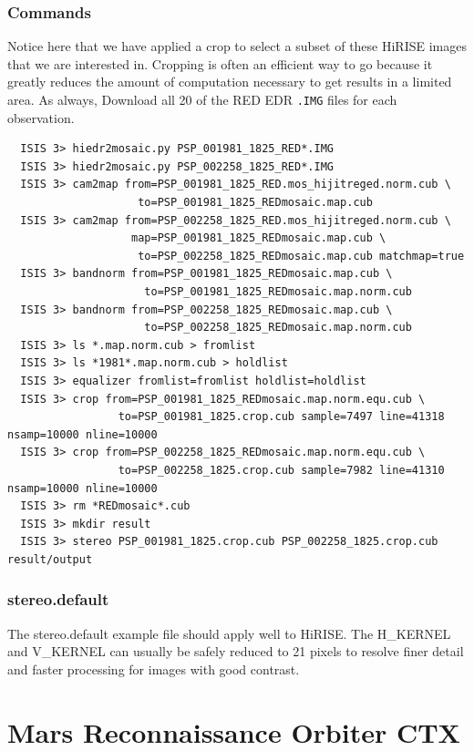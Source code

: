 \subsubsection*{Commands}

Notice here that we have applied a crop to select a subset of these
HiRISE images that we are interested in.  Cropping is often an
efficient way to go because it greatly reduces the amount of
computation necessary to get results in a limited area.  As always,
Download all 20 of the RED EDR \texttt{.IMG} files for each observation.
\begin{verbatim}
  ISIS 3> hiedr2mosaic.py PSP_001981_1825_RED*.IMG
  ISIS 3> hiedr2mosaic.py PSP_002258_1825_RED*.IMG
  ISIS 3> cam2map from=PSP_001981_1825_RED.mos_hijitreged.norm.cub \
                    to=PSP_001981_1825_REDmosaic.map.cub
  ISIS 3> cam2map from=PSP_002258_1825_RED.mos_hijitreged.norm.cub \
                   map=PSP_001981_1825_REDmosaic.map.cub \
                    to=PSP_002258_1825_REDmosaic.map.cub matchmap=true
  ISIS 3> bandnorm from=PSP_001981_1825_REDmosaic.map.cub \
                     to=PSP_001981_1825_REDmosaic.map.norm.cub
  ISIS 3> bandnorm from=PSP_002258_1825_REDmosaic.map.cub \
                     to=PSP_002258_1825_REDmosaic.map.norm.cub
  ISIS 3> ls *.map.norm.cub > fromlist
  ISIS 3> ls *1981*.map.norm.cub > holdlist
  ISIS 3> equalizer fromlist=fromlist holdlist=holdlist
  ISIS 3> crop from=PSP_001981_1825_REDmosaic.map.norm.equ.cub \
                 to=PSP_001981_1825.crop.cub sample=7497 line=41318 nsamp=10000 nline=10000
  ISIS 3> crop from=PSP_002258_1825_REDmosaic.map.norm.equ.cub \
                 to=PSP_002258_1825.crop.cub sample=7982 line=41310 nsamp=10000 nline=10000
  ISIS 3> rm *REDmosaic*.cub
  ISIS 3> mkdir result
  ISIS 3> stereo PSP_001981_1825.crop.cub PSP_002258_1825.crop.cub result/output
\end{verbatim}

\subsubsection*{stereo.default}

The stereo.default example file should apply well to HiRISE. The
H\_KERNEL and V\_KERNEL can usually be safely reduced to 21 pixels to
resolve finer detail and faster processing for images with good
contrast.

\vfill

\section{Mars Reconnaissance Orbiter CTX}

